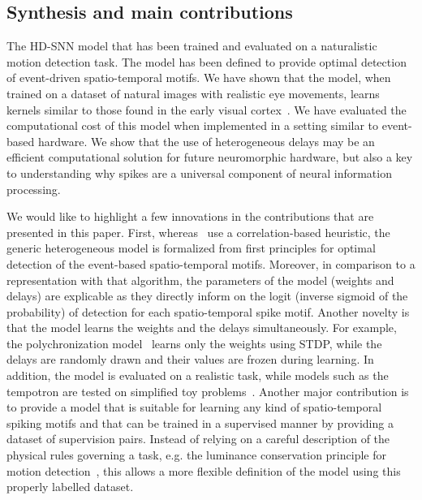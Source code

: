 \documentclass[default]{sn-jnl}%
\theoremstyle{thmstyleone}%
\theoremstyle{thmstyletwo}%
\theoremstyle{thmstylethree}%
\begin{document}
\subsection{Synthesis and main contributions}
The HD-SNN model that has been trained and evaluated on a naturalistic motion detection task. The model has been defined to provide optimal detection of event-driven spatio-temporal motifs. We have shown that the model, when trained on a dataset of natural images with realistic eye movements, learns kernels similar to those found in the early visual cortex~\cite{deangelis_functional_1999, kremkow_push-pull_2016}. %
We have evaluated the computational cost of this model when implemented in a setting similar to event-based hardware. We show that the use of heterogeneous delays may be an efficient computational solution for future neuromorphic hardware, but also a key to understanding why spikes are a universal component of neural information processing.

We would like to highlight a few innovations in the contributions that are presented in this paper. First, whereas~\citep{ghosh_spatiotemporal_2019,yu_stsc-snn_2022} use a correlation-based heuristic, the generic heterogeneous model is formalized from first principles for optimal detection of the event-based spatio-temporal motifs. Moreover, in comparison to a representation with that algorithm, the parameters of the model (weights and delays) are explicable as they directly inform on the logit (inverse sigmoid of the probability) of detection for each spatio-temporal spike motif. Another novelty is that the model learns the weights and the delays simultaneously. For example, the polychronization model~\citep{izhikevich_polychronization_2006} learns only the weights using STDP, while the delays are randomly drawn and their values are frozen during learning. In addition, the model is evaluated on a realistic task, while models such as the tempotron are tested on simplified toy problems~\citep{gutig_tempotron_2006}. Another major contribution is to provide a model that is suitable for learning any kind of spatio-temporal spiking motifs and that can be trained in a supervised manner by providing a dataset of supervision pairs. Instead of relying on a careful description of the physical rules governing a task, e.g. the luminance conservation principle for motion detection~\citep{benosman_asynchronous_2012, dardelet_event-by-event_2021}, this allows a more flexible definition of the model using this properly labelled dataset.
%
\end{document}
